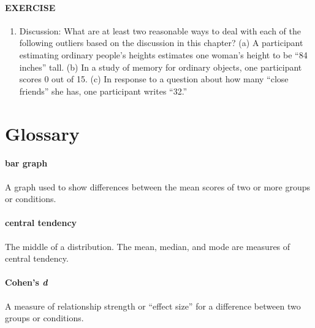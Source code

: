 \documentclass[
]{krantz}
\providecommand{\tightlist}{%
  \setlength{\itemsep}{0pt}\setlength{\parskip}{0pt}}
\begin{document}
\hypertarget{exercise-8}{%
\paragraph*{EXERCISE}\label{exercise-8}}

\begin{enumerate}
\def\labelenumi{\arabic{enumi}.}
\tightlist
\item
  Discussion: What are at least two reasonable ways to deal with each of the following outliers based on the discussion in this chapter? (a) A participant estimating ordinary people's heights estimates one woman's height to be ``84 inches'' tall. (b) In a study of memory for ordinary objects, one participant scores 0 out of 15. (c) In response to a question about how many ``close friends'' she has, one participant writes ``32.''
\end{enumerate}

\hypertarget{glossary-12}{%
\section{Glossary}\label{glossary-12}}

\hypertarget{bar-graph-2}{%
\paragraph*{bar graph}\label{bar-graph-2}}

A graph used to show differences between the mean scores of two or more groups or conditions.

\hypertarget{central-tendency-1}{%
\paragraph*{central tendency}\label{central-tendency-1}}

The middle of a distribution. The mean, median, and mode are measures of central tendency.

\hypertarget{cohens-d}{%
\paragraph*{\texorpdfstring{Cohen's \emph{d}}{Cohen's d}}\label{cohens-d}}

A measure of relationship strength or ``effect size'' for a difference between two groups or conditions.
\end{document}
